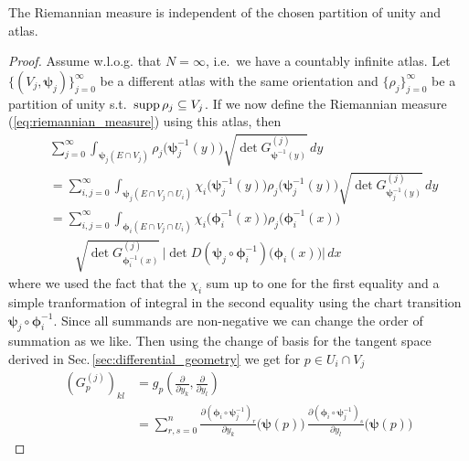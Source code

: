 \documentclass[../master_thesis.tex]{subfiles}
\begin{document}
\begin{proposition}
    The Riemannian measure is independent of the chosen partition of unity and atlas.
\end{proposition}
\begin{proof}
    Assume w.l.o.g. that $N=\infty$, i.e.~we have a countably infinite atlas.
    Let $\{(V_j, \boldsymbol{\psi}_j)\}_{j=0}^\infty$ 
    be a different atlas with the same orientation and 
    $\{\rho_j\}_{j=0}^\infty$ be a partition of unity s.t.~$\operatorname{supp} \rho_j \subseteq V_j$. If we now 
    define the Riemannian measure (\ref{eq:riemannian_measure}) using this atlas, then
    \begin{align}
        &\sum_{j=0}^\infty \int_{\boldsymbol{\psi}_j(E\cap V_j)} \rho_j\big(\boldsymbol{\psi}_j^{-1}(y)\big)
            \sqrt{\det G^{(j)}_{\boldsymbol{\psi}^{-1}(y)}} \, dy \nonumber
        \\ &= \sum_{i,j=0}^\infty \int_{\boldsymbol{\psi}_j(E\cap V_j \cap U_i)} \chi_i\big(\boldsymbol{\psi}_j^{-1}(y)\big)
            \rho_j\big(\boldsymbol{\psi}_j^{-1}(y)\big)
            \sqrt{\det G^{(j)}_{\boldsymbol{\psi}_j^{-1}(y)}} \, dy \nonumber
        \\ &= \sum_{i,j=0}^\infty \int_{\boldsymbol{\phi}_i(E\cap V_j \cap U_i)} \chi_i\big(\boldsymbol{\phi}_i^{-1}(x)\big) 
            \rho_j\big(\boldsymbol{\phi}_i^{-1}(x)\big)
        \\ &\qquad\sqrt{\det G^{(j)}_{\boldsymbol{\phi}_i^{-1}(x)}} \, \Big| \det D(\boldsymbol{\psi}_j 
            \circ \boldsymbol{\phi}^{-1}_i) \big(\boldsymbol{\phi}_i(x)\big) \Big|\, dx \label{eq:double_sum_riemannian_measure}
    \end{align}
    where we used the fact that the $\chi_i$ sum up to one for the first 
    equality and a simple tranformation of integral in the second equality
    using the chart transition $\boldsymbol{\psi}_j\circ \boldsymbol{\phi}_i^{-1}$. Since all summands 
    are non-negative we can change the order of summation as we like. Then using the 
    change of basis for the tangent space derived in Sec.\,\ref{sec:differential_geometry}
    we get for $p \in U_i \cap V_j$
    \begin{align*}
        (G^{(j)}_p)_{kl} &= g_p(\frac{\partial}{\partial y_k}, \frac{\partial}{\partial y_l})
        \\ &= \sum_{r,s=0}^n \frac{\partial(\boldsymbol{\phi}_i 
            \circ \boldsymbol{\psi}_j^{-1})_r}{\partial y_k}\big(\boldsymbol{\psi}(p)\big)
            \, \frac{\partial(\boldsymbol{\phi}_i 
            \circ \boldsymbol{\psi}_j^{-1})_s}{\partial y_l}\big(\boldsymbol{\psi}(p)\big)

\end{align*}
\end{proof}
\end{document}
